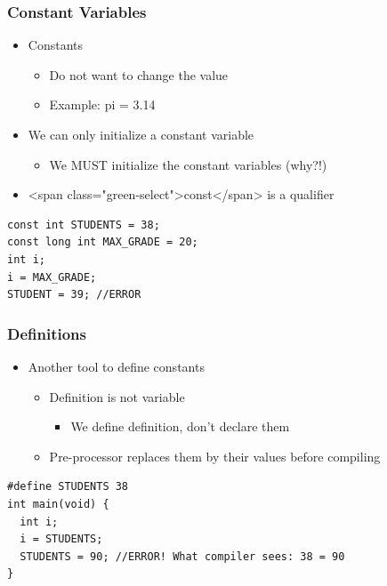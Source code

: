 \documentclass{../c-lecture}
\begin{document}
\begin{frame}[fragile]
  \frametitle{Constant Variables}
  \begin{itemize}
    \item Constants
    \begin{itemize}
      \item Do not want to change the value
      \item Example: pi = 3.14
    \end{itemize}
    \item We can only initialize a constant variable
    \begin{itemize}
      \item We MUST initialize the constant variables (why?!)
    \end{itemize}
    \item <span class="green-select">const</span> is a qualifier
  \end{itemize}
  \begin{verbatim}
const int STUDENTS = 38;
const long int MAX_GRADE = 20;
int i;
i = MAX_GRADE;
STUDENT = 39; //ERROR
  \end{verbatim}
\end{frame}

\begin{frame}[fragile]
  \frametitle{Definitions}
  \begin{itemize}
    \item Another tool to define constants
    \begin{itemize}
      \item Definition is not variable
      \begin{itemize}
        \item We define definition, don’t declare them
      \end{itemize}
      \item Pre-processor replaces them by their values before compiling
    \end{itemize}
  \end{itemize}
  \begin{verbatim}
#define STUDENTS 38
int main(void) {
  int i;
  i = STUDENTS;
  STUDENTS = 90; //ERROR! What compiler sees: 38 = 90
}
  \end{verbatim}
\end{frame}
\end{document}

